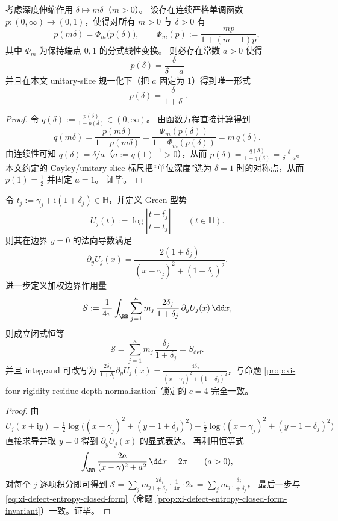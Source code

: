 \begin{proposition}[深度权重的唯一性：乘法伸缩半群的 Möbius 线性化强制 \texorpdfstring{$p(\delta)=\delta/(1+\delta)$}{p(delta)=delta/(1+delta)}]\label{prop:xi-depth-weight-uniqueness-mobius-linearization}
考虑深度伸缩作用 \(\delta\mapsto m\delta\)（\(m>0\)）。
设存在连续严格单调函数 \(p:(0,\infty)\to(0,1)\)，使得对所有 \(m>0\) 与 \(\delta>0\) 有
\[
p(m\delta)=\Phi_m\!\bigl(p(\delta)\bigr),
\qquad
\Phi_m(p):=\frac{m p}{1+(m-1)p},
\]
其中 \(\Phi_m\) 为保持端点 \(0,1\) 的分式线性变换。
则必存在常数 \(a>0\) 使得
\[
\boxed{\;
p(\delta)=\frac{\delta}{\delta+a}\;}
\]
并且在本文 unitary-slice 规一化下（把 \(a\) 固定为 \(1\)）得到唯一形式
\[
\boxed{\;
p(\delta)=\frac{\delta}{1+\delta}\; }.
\]
\end{proposition}

\begin{proof}
令 \(q(\delta):=\frac{p(\delta)}{1-p(\delta)}\in(0,\infty)\)。
由函数方程直接计算得到
\[
q(m\delta)=\frac{p(m\delta)}{1-p(m\delta)}=\frac{\Phi_m(p(\delta))}{1-\Phi_m(p(\delta))}=m\,q(\delta).
\]
由连续性可知 \(q(\delta)=\delta/a\)（\(a:=q(1)^{-1}>0\)），从而
\(
p(\delta)=\frac{q(\delta)}{1+q(\delta)}=\frac{\delta}{\delta+a}
\)。
本文约定的 Cayley/unitary-slice 标尺把“单位深度”选为 \(\delta=1\) 时的对称点，从而 \(p(1)=\tfrac12\) 并固定 \(a=1\)。
证毕。
\end{proof}

\begin{proposition}\label{prop:xi-defect-entropy-green-neumann-boundary-action}
令 \(t_j:=\gamma_j+\mathrm{i}(1+\delta_j)\in\mathbb H\)，并定义 Green 型势
\[
U_j(t):=\log\left|\frac{t-\overline{t_j}}{t-t_j}\right|
\qquad(t\in\mathbb H).
\]
则其在边界 \(y=0\) 的法向导数满足
\[
\partial_y U_j(x)=\frac{2(1+\delta_j)}{(x-\gamma_j)^2+(1+\delta_j)^2}.
\]
进一步定义加权边界作用量
\[
\mathcal S
:=\frac{1}{4\pi}\int_{\RR}\sum_{j=1}^{\kappa}m_j\,\frac{2\delta_j}{1+\delta_j}\,\partial_y U_j(x)\,\dd x,
\]
则成立闭式恒等
\[
\boxed{\;
\mathcal S=\sum_{j=1}^{\kappa}m_j\,\frac{\delta_j}{1+\delta_j}=S_{\mathrm{def}}.\;}
\]
并且 integrand 可改写为
\(
\frac{2\delta_j}{1+\delta_j}\partial_y U_j(x)=\frac{4\delta_j}{(x-\gamma_j)^2+(1+\delta_j)^2}
\)，与命题 \ref{prop:xi-four-rigidity-residue-depth-normalization} 锁定的 \(c=4\) 完全一致。
\end{proposition}

\begin{proof}
由
\(
U_j(x+\mathrm{i}y)
=\frac12\log\!\bigl((x-\gamma_j)^2+(y+1+\delta_j)^2\bigr)
-\frac12\log\!\bigl((x-\gamma_j)^2+(y-1-\delta_j)^2\bigr)
\)
直接求导并取 \(y=0\) 得到 \(\partial_y U_j(x)\) 的显式表达。
再利用恒等式
\[
\int_{\RR}\frac{2a}{(x-\gamma)^2+a^2}\,\dd x=2\pi\qquad(a>0),
\]
对每个 \(j\) 逐项积分即可得到
\(
\mathcal S=\sum_j m_j\frac{2\delta_j}{1+\delta_j}\cdot\frac{1}{4\pi}\cdot 2\pi
=\sum_j m_j\frac{\delta_j}{1+\delta_j}
\)，
最后一步与 \eqref{eq:xi-defect-entropy-closed-form}（命题 \ref{prop:xi-defect-entropy-closed-form-invariant}）一致。证毕。
\end{proof}

